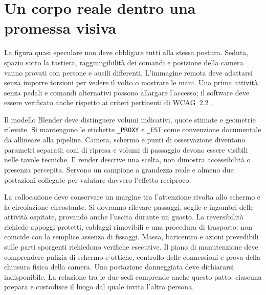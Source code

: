 \section{Un corpo reale dentro una promessa visiva}

La figura quasi speculare non deve obbligare tutti alla stessa postura.
Seduta, spazio sotto la tastiera, raggiungibilità dei comandi e posizione
della camera vanno provati con persone e ausili differenti. L'immagine
remota deve adattarsi senza imporre torsioni per vedere il volto o
mostrare le mani. Una prima attività senza pedali e comandi alternativi
possono allargare l'accesso; il software deve essere verificato anche
rispetto ai criteri pertinenti di WCAG~2.2 \cite{des_wcag22}.

Il modello Blender deve distinguere volumi indicativi, quote stimate e
geometrie rilevate. Si mantengono le etichette \texttt{\_PROXY} e
\texttt{\_EST} come convenzione documentale da allineare alla pipeline.
Camera, schermo e punti di osservazione diventano parametri separati;
coni di ripresa e volumi di passaggio devono essere visibili nelle tavole
tecniche. Il render descrive una scelta, non dimostra accessibilità o
presenza percepita. Servono un campione a grandezza reale e almeno due
postazioni collegate per valutare davvero l'effetto reciproco.

La collocazione deve conservare un margine tra l'attenzione rivolta allo
schermo e la circolazione circostante. Si dovranno rilevare passaggi,
soglie e ingombri delle attività ospitate, provando anche l'uscita durante
un guasto. La reversibilità richiede appoggi protetti, cablaggi rimovibili
e una procedura di trasporto: non coincide con la semplice assenza di
fissaggi. Massa, baricentro e azioni prevedibili sulle parti sporgenti
richiedono verifiche esecutive. Il piano di manutenzione deve comprendere
pulizia di schermo e ottiche, controllo delle connessioni e prova della
chiusura fisica della camera. Una postazione danneggiata deve dichiararsi
indisponibile. La relazione tra le due sedi comprende anche questo patto:
ciascuna prepara e custodisce il luogo dal quale invita l'altra persona.

